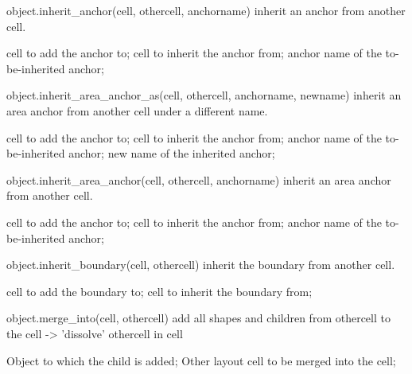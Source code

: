 \begin{APIfunc}{object.inherit\_anchor(cell, othercell, anchorname)}
    inherit an anchor from another cell.
    \begin{APIparameters}
            cell to add the anchor to;
            cell to inherit the anchor from;
            anchor name of the to-be-inherited anchor;
    \end{APIparameters}
\end{APIfunc}
\begin{APIfunc}{object.inherit\_area\_anchor\_as(cell, othercell, anchorname, newname)}
    inherit an area anchor from another cell under a different name.
    \begin{APIparameters}
            cell to add the anchor to;
            cell to inherit the anchor from;
            anchor name of the to-be-inherited anchor;
            new name of the inherited anchor;
    \end{APIparameters}
\end{APIfunc}
\begin{APIfunc}{object.inherit\_area\_anchor(cell, othercell, anchorname)}
    inherit an area anchor from another cell.
    \begin{APIparameters}
            cell to add the anchor to;
            cell to inherit the anchor from;
            anchor name of the to-be-inherited anchor;
    \end{APIparameters}
\end{APIfunc}
\begin{APIfunc}{object.inherit\_boundary(cell, othercell)}
    inherit the boundary from another cell.
    \begin{APIparameters}
            cell to add the boundary to;
            cell to inherit the boundary from;
    \end{APIparameters}
\end{APIfunc}
\begin{APIfunc}{object.merge\_into(cell, othercell)}
    add all shapes and children from othercell to the cell -> 'dissolve' othercell in cell
    \begin{APIparameters}
            Object to which the child is added;
            Other layout cell to be merged into the cell;
    \end{APIparameters}
\end{APIfunc}
